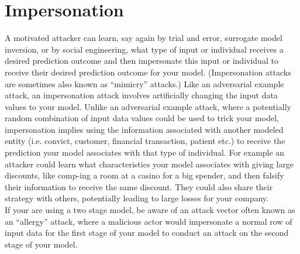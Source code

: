 \documentclass[fleqn]{article}
\begin{document}
\section{Impersonation} \label{sec:impersonation}

\noindent A motivated attacker can learn, say again by trial and error, surrogate model inversion, or by social engineering, what type of input or individual receives a desired prediction outcome and then impersonate this input or individual to receive their desired prediction outcome for your model. (Impersonation attacks are sometimes also known as ``mimicry'' attacks.) Like an adversarial example attack, an impersonation attack involves artificially changing the input data values to your model. Unlike an adversarial example attack, where a potentially random combination of input data values could be used to trick your model, impersonation implies using the information associated with another modeled entity (i.e. convict, customer, financial transaction, patient etc.) to receive the prediction your model associates with that type of individual. For example an attacker could learn what characteristics your model associates with giving large discounts, like comp-ing a room at a casino for a big spender, and then falsify their information to receive the same discount. They could also share their strategy with others, potentially leading to large losses for your company.\\

\noindent If your are using a two stage model, be aware of an attack vector often known as an ``allergy'' attack, where a malicious actor would impersonate a normal row of input data for the first stage of your model to conduct an attack on the second stage of your model.\\
\end{document}

